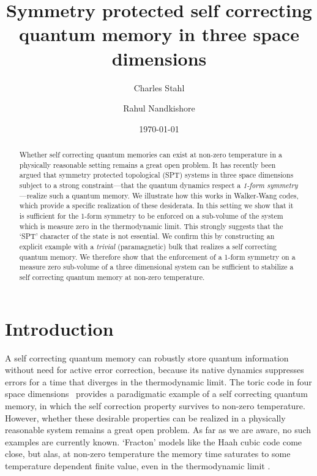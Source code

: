 \documentclass[twocolumn, longbibliography]{revtex4-2}
\begin{document}
	
\title{Symmetry protected self correcting quantum memory in three space dimensions}
\author{Charles Stahl}
\author{Rahul Nandkishore}

	
\begin{abstract}
Whether self correcting quantum memories can exist at non-zero temperature in a physically reasonable setting remains a great open problem. It has recently been argued \cite{RobertsBartlett} that symmetry protected topological (SPT) systems in three space dimensions subject to a strong constraint---that the quantum dynamics respect a {\it 1-form symmetry}---realize such a quantum memory. We illustrate how this works in Walker-Wang codes, which provide a specific realization of these desiderata. In this setting we show that it is sufficient for the 1-form symmetry to be enforced on a sub-volume of the system which is measure zero in the thermodynamic limit. This strongly suggests that the `SPT' character of the state is not essential. We confirm this by constructing an explicit example with a {\it trivial} (paramagnetic) bulk that realizes a self correcting quantum memory. We therefore show that the enforcement of a 1-form symmetry on a measure zero sub-volume of a three dimensional system can be sufficient to stabilize a self correcting quantum memory at non-zero temperature. 
\end{abstract}
	
\date{\today}
	
\maketitle
	
\section{Introduction}
A self correcting quantum memory can robustly store quantum information without need for active error correction, because its native dynamics suppresses errors for a time that diverges in the thermodynamic limit. The toric code in four space dimensions~\cite{Kitaev2003} provides a paradigmatic example of a self correcting quantum memory, in which the self correction property survives to non-zero temperature. However, whether these desirable properties can be realized in a physically reasonable system remains a great open problem. As far as we are aware, no such examples are currently known. `Fracton' models like the Haah cubic code \cite{HaahCode} come close, but alas, at non-zero temperature the memory time saturates to some temperature dependent finite value, even in the thermodynamic limit \cite{Siva2017, PremHaahNandkishore}. 
\end{document}
